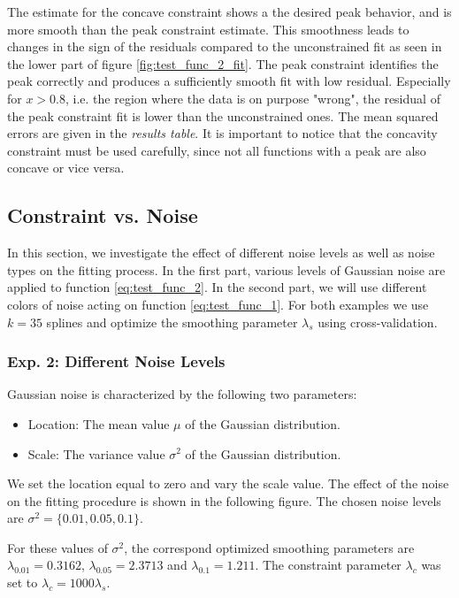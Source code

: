 \documentclass[10pt,a4paper]{article}
\begin{document}
The estimate for the concave constraint shows a the desired peak behavior, and is more smooth than the peak constraint estimate. This smoothness leads to changes in the sign of the residuals compared to the unconstrained fit as seen in the lower part of figure \ref{fig:test_func_2_fit}. The peak constraint identifies the peak correctly and produces a sufficiently smooth fit with low residual. Especially for $x >0.8$, i.e. the region where the data is on purpose "wrong", the residual of the peak constraint fit is lower than the unconstrained ones. The mean squared errors are given in the \emph{results table}. 
It is important to notice that the concavity constraint must be used carefully, since not all functions with a peak are also concave or vice versa.

\subsection{Constraint vs. Noise}

In this section, we investigate the effect of different noise levels as well as noise types on the fitting process. In the first part, various levels of Gaussian noise are applied to function \ref{eq:test_func_2}. In the second part, we will use different colors of noise acting on function \ref{eq:test_func_1}. For both examples we use $k=35$ splines and optimize the smoothing parameter $\lambda_s$ using cross-validation. 

\subsubsection{Exp. 2: Different Noise Levels}

Gaussian noise is characterized by the following two parameters:
\begin{itemize}
	\item Location: The mean value $\mu$ of the Gaussian distribution.
	\item Scale: The variance value $\sigma^2$ of the Gaussian distribution.
\end{itemize}

We set the location equal to zero and vary the scale value. The effect of the noise on the fitting procedure is shown in the following figure. The chosen noise levels are $\sigma^2 = \{0.01, 0.05, 0.1\}$.

For these values of $\sigma^2$, the correspond optimized smoothing parameters are $\lambda_{0.01} = 0.3162$, $\lambda_{0.05} = 2.3713$ and $\lambda_{0.1} = 1.211$. The constraint parameter $\lambda_c$ was set to $\lambda_c = 1000 \lambda_s$. 
\end{document}
